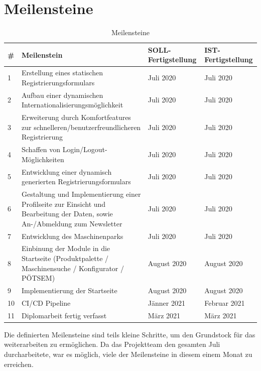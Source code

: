 \section{Meilensteine}
\begin{table}[H]
	\centering
{
	\setlength{\arrayrulewidth}{1pt}
\begin{tabular}[h]{|l|p{8cm}|p{2.5cm}|p{2.5cm}|}
	\hline
	\# & Meilenstein & SOLL-Fertigstellung & IST-Fertigstellung \\
	\hline
	1 & Erstellung eines statischen Registrierungsformulars & Juli 2020 & Juli 2020 \\
	\hline
	2 & Aufbau einer dynamischen Internationalisierungsmöglichkeit & Juli 2020 & Juli 2020 \\	
	\hline
	3 & Erweiterung durch Komfortfeatures zur schnelleren/benutzerfreundlicheren Registrierung & Juli 2020 & Juli 2020 \\
	\hline
	4 & Schaffen von Login/Logout-Möglichkeiten & Juli 2020 & Juli 2020 \\	
	\hline
	5 & Entwicklung einer dynamisch generierten Registrierungsformulars & Juli 2020 & Juli 2020 \\	
	\hline
	6 & Gestaltung und Implementierung einer Profilseite zur Einsicht und Bearbeitung der Daten, sowie An-/Abmeldung zum Newsletter & Juli 2020 & Juli 2020 \\	
	\hline
	7 & Entwicklung des Maschinenparks & Juli 2020 & Juli 2020 \\	
	\hline
	8 & Einbinung der Module in die Startseite (Produktpalette / Maschinensuche / Konfigurator / PÖTSEM) & August 2020 & August 2020 \\	
	\hline
	9 & Implementierung der Startseite & August 2020 & August 2020 \\	
	\hline
	10 & CI/CD Pipeline & Jänner 2021 & Februar 2021 \\	
	\hline	
	11 & Diplomarbeit fertig verfasst & März 2021 & März 2021 \\
	\hline
\end{tabular}
}
\caption{Meilensteine}
\end{table}
Die definierten Meilensteine sind teils kleine Schritte, um den Grundstock für das weiterarbeiten zu ermöglichen. Da das Projektteam den gesamten Juli durcharbeitete, war es möglich, viele der Meilensteine in diesem einem Monat zu erreichen. 

